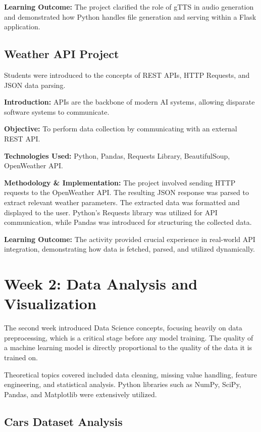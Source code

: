 \textbf{Learning Outcome:} The project clarified the role of gTTS in audio generation and demonstrated how Python handles file generation and serving within a Flask application.

\subsection{Weather API Project}

Students were introduced to the concepts of REST APIs, HTTP Requests, and JSON data parsing.

\textbf{Introduction:} APIs are the backbone of modern AI systems, allowing disparate software systems to communicate.

\textbf{Objective:} To perform data collection by communicating with an external REST API.

\textbf{Technologies Used:} Python, Pandas, Requests Library, BeautifulSoup, OpenWeather API.

\textbf{Methodology \& Implementation:} The project involved sending HTTP requests to the OpenWeather API. The resulting JSON response was parsed to extract relevant weather parameters. The extracted data was formatted and displayed to the user. Python's Requests library was utilized for API communication, while Pandas was introduced for structuring the collected data.

\textbf{Learning Outcome:} The activity provided crucial experience in real-world API integration, demonstrating how data is fetched, parsed, and utilized dynamically.

\section{Week 2: Data Analysis and Visualization}

The second week introduced Data Science concepts, focusing heavily on data preprocessing, which is a critical stage before any model training. The quality of a machine learning model is directly proportional to the quality of the data it is trained on.

Theoretical topics covered included data cleaning, missing value handling, feature engineering, and statistical analysis. Python libraries such as \cite{numpy} NumPy, SciPy, \cite{pandas} Pandas, and \cite{matplotlib} Matplotlib were extensively utilized.

\subsection{Cars Dataset Analysis}

